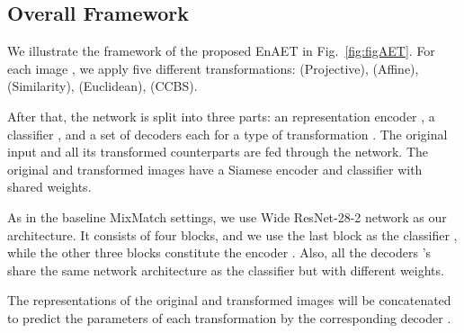 \documentclass[journal]{IEEEtran}
\begin{document}
\subsection{Overall Framework}
\label{sec:frameillustrate}
\par We illustrate the framework of the proposed EnAET in Fig.~\ref{fig:figAET}. For each image , we apply five different transformations: (Projective),
(Affine),
(Similarity),
(Euclidean),
(CCBS).
\par After that, the network is split into three parts: an representation encoder , a classifier , and a set of decoders  each for a type of transformation . The original input   and all its transformed counterparts  are fed through the network.  The original and transformed images have a Siamese encoder  and classifier  with shared weights.

\par As in the baseline MixMatch settings, we use Wide ResNet-28-2 network as our architecture. It consists of four blocks, and we use the last block as the classifier , while the other three blocks constitute the encoder . Also, all the decoders 's share the same network architecture as the classifier  but with different weights.

\par The representations of the original and transformed images will be concatenated to predict the  parameters of each transformation  by the corresponding decoder .
\end{document}
